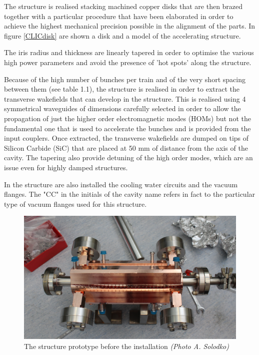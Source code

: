 The structure is realised stacking machined copper disks that are then brazed together with a particular procedure that have been elaborated in order to achieve the highest mechanical precision possible in the alignment of the parts. In figure \ref{CLICdisk} are shown a disk and a model of the accelerating structure.

The iris radius and thickness are linearly tapered in order to optimise the various high power parameters and avoid the presence of 'hot spots' along the structure. 

Because of the high number of bunches per train and of the very short spacing between them (see table 1.1), the structure is realised in order to extract the transverse wakefields that can develop in the structure. This is realised using 4 symmetrical waveguides of dimensions carefully selected in order to allow the propagation of just the higher order electromagnetic modes (HOMs) but not the fundamental one that is used to accelerate the bunches and is provided from the input couplers. Once extracted, the transverse wakefields are dumped on tips of Silicon Carbide (SiC) that are placed at 50 mm of distance from the axis of the cavity.
The tapering also provide detuning of the high order modes, which are an issue even for highly damped structures.

In the structure are also installed the cooling water circuits and the vacuum flanges. The "CC" in the initials of the cavity name refers in fact to the particular type of vacuum flanges used for this structure.

\begin{figure}[h]
\centering

\includegraphics[scale=0.16]{pictures/td26_test_photo}
\caption{The structure prototype before the installation \textit{(Photo A. Solodko)}}
\label{td26_test_photo}

\end{figure}


